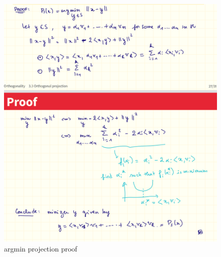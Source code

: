 \documentclass[12pt,twoside]{article}
\begin{document}
\begin{figure}[h]
    \centering
    \includegraphics[scale=.65]{argmin projection proof.png}
    \caption{argmin projection proof}
    \label{fig:my_label}
\end{figure}
\end{document}
